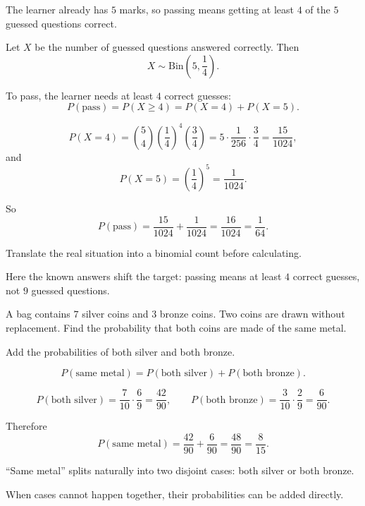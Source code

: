 \begin{hint}
The learner already has $5$ marks, so passing means getting at least $4$ of the $5$ guessed questions correct.
\end{hint}

\begin{solution}
Let $X$ be the number of guessed questions answered correctly. Then
\[
X\sim \mathrm{Bin}\left(5,\frac14\right).
\]

To pass, the learner needs at least $4$ correct guesses:
\[
P(\text{pass})=P(X\ge 4)=P(X=4)+P(X=5).
\]

\[
P(X=4)=\binom54\left(\frac14\right)^4\left(\frac34\right)
=5\cdot \frac1{256}\cdot \frac34=\frac{15}{1024},
\]
and
\[
P(X=5)=\left(\frac14\right)^5=\frac1{1024}.
\]

So
\[
P(\text{pass})=\frac{15}{1024}+\frac1{1024}=\frac{16}{1024}=\frac1{64}.
\]
\end{solution}

\begin{takeaways}
\item Translate the real situation into a binomial count before calculating.
\item Here the known answers shift the target: passing means at least $4$ correct guesses, not $9$ guessed questions.
\end{takeaways}

\begin{problem}
A bag contains $7$ silver coins and $3$ bronze coins. Two coins are drawn without replacement. Find the probability that both coins are made of the same metal.
\end{problem}

\begin{hint}
Add the probabilities of both silver and both bronze.
\end{hint}

\begin{solution}
\[
P(\text{same metal})=P(\text{both silver})+P(\text{both bronze}).
\]

\[
P(\text{both silver})=\frac7{10}\cdot\frac69=\frac{42}{90},
\qquad
P(\text{both bronze})=\frac3{10}\cdot\frac29=\frac6{90}.
\]

Therefore
\[
P(\text{same metal})=\frac{42}{90}+\frac6{90}=\frac{48}{90}=\frac{8}{15}.
\]
\end{solution}

\begin{takeaways}
\item ``Same metal'' splits naturally into two disjoint cases: both silver or both bronze.
\item When cases cannot happen together, their probabilities can be added directly.
\end{takeaways}

